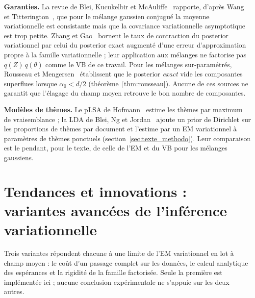 \textbf{Garanties. }La revue de Blei, Kucukelbir et McAuliffe~\cite{blei2017} rapporte, d'après Wang et Titterington~\cite{wang2006,wang2005}, que pour le mélange gaussien conjugué la moyenne variationnelle est consistante mais que la covariance variationnelle asymptotique est trop petite. Zhang et Gao~\cite{zhang2020} bornent le taux de contraction du posterior variationnel par celui du posterior exact augmenté d'une erreur d'approximation propre à la famille variationnelle ; leur application aux mélanges ne factorise pas $q(Z)\,q(\theta)$ comme le VB de ce travail. Pour les mélanges sur-paramétrés, Rousseau et Mengersen~\cite{rousseau2011} établissent que le posterior \emph{exact} vide les composantes superflues lorsque $\alpha_0 < d/2$ (théorème~\ref{thm:rousseau}). Aucune de ces sources ne garantit que l'élagage du champ moyen retrouve le bon nombre de composantes.

\textbf{Modèles de thèmes. }Le pLSA de Hofmann~\cite{hofmann1999} estime les thèmes par maximum de vraisemblance ; la LDA de Blei, Ng et Jordan~\cite{blei2003} ajoute un prior de Dirichlet sur les proportions de thèmes par document et l'estime par un EM variationnel à paramètres de thèmes ponctuels (section~\ref{sec:texte_methodo}). Leur comparaison est le pendant, pour le texte, de celle de l'EM et du VB pour les mélanges gaussiens.

\section{Tendances et innovations : variantes avancées de l'inférence variationnelle}\label{sec:variantes_vb}
Trois variantes répondent chacune à une limite de l'EM variationnel en lot à champ moyen : le coût d'un passage complet sur les données, le calcul analytique des espérances et la rigidité de la famille factorisée. Seule la première est implémentée ici ; aucune conclusion expérimentale ne s'appuie sur les deux autres.

